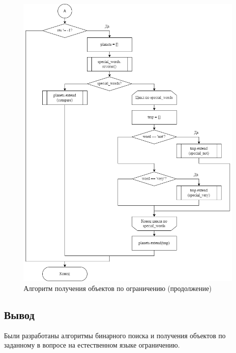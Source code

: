 \begin{figure}[h!btp]
	\centering
	\includegraphics[width=460pt]{inc/get_planets_2.png}
	\caption{Алгоритм получения объектов по ограничению (продолжение)}
	\label{fig:get2}	
\end{figure}

\clearpage

\vspace{\baselineskip}
\subsection*{Вывод}
\vspace{\baselineskip}

Были разработаны алгоритмы бинарного поиска и получения объектов по заданному в вопросе на естественном языке ограничению.
